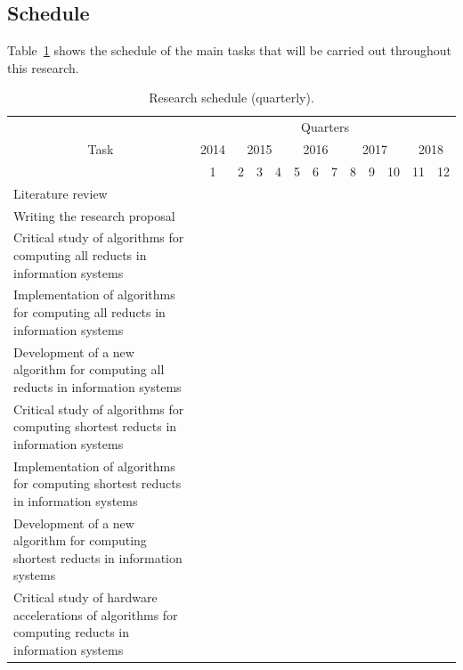 \documentclass[authoryear,11pt]{elsarticle}
\begin{document}
\subsection{Schedule}
  Table~\ref{tab_Schedule} shows the schedule of the main tasks that will be carried out throughout this research.
 \begin{table}[h!]
		\caption{Research schedule (quarterly\protect\footnotemark).} \label{tab_Schedule}
		\centering
 	\begin{tabular}{|p{7cm}|c|c|c|c|c|c|c|c|c|c|c|c|}
 		\hline
		\multicolumn{1}{|c|}{\multirow{3}{*}{Task}} & \multicolumn{12}{c|}{Quarters}\\
 		\cline{2-13}
		 & 2014 & \multicolumn{3}{c|}{2015} & \multicolumn{3}{c|}{2016} & \multicolumn{3}{c|}{2017}
		 & \multicolumn{2}{c|}{2018} \\
 		\cline{2-13}
		 & 1 & 2 & 3 & 4 & 5 & 6 & 7 & 8 & 9 & 10 & 11 & 12 \\
		\hline
		Literature review &\cellcolor{blue}&\cellcolor{blue}&\cellcolor{blue}&
		\cellcolor[gray]{0.9}&\cellcolor[gray]{0.9}&\cellcolor[gray]{0.9}&\cellcolor[gray]{0.9}&
		\cellcolor[gray]{0.9}&\cellcolor[gray]{0.9}&\cellcolor[gray]{0.9}&\cellcolor[gray]{0.9}&
		\cellcolor[gray]{0.9}\\
		\hline
		Writing the research proposal &\cellcolor{blue}&\cellcolor{blue}&\cellcolor{blue}&&&&&&&&&\\
		\hline
		Critical study of algorithms for computing all reducts in information systems
		&\cellcolor{blue}&\cellcolor{blue}&\cellcolor{blue}&&&&&&&&&\\
		\hline
		Implementation of algorithms for computing all reducts in information systems
		&&\cellcolor{blue}&\cellcolor{blue}&&&&&&&&&\\
		\hline
		Development of a new algorithm for computing all reducts in information systems
		&&&&\cellcolor[gray]{0.9}&&&&&&&&\\
		\hline
		Critical study of algorithms for computing shortest reducts in information systems
		&&&&\cellcolor[gray]{0.9}&\cellcolor[gray]{0.9}&\cellcolor[gray]{0.9}&&&&&&\\
		\hline
		Implementation of algorithms for computing shortest reducts in information systems
		&&&&&\cellcolor[gray]{0.9}&\cellcolor[gray]{0.9}&&&&&&\\
		\hline
		Development of a new algorithm for computing shortest reducts in information systems
		&&&&&&&\cellcolor[gray]{0.9}&&&&&\\
		\hline
		Critical study of hardware accelerations of algorithms for computing reducts in information systems

\end{tabular}
\end{table}
\end{document}
